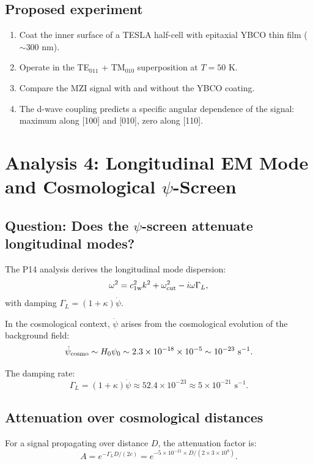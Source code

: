 \documentclass[11pt]{article}
\newcommand{\ee}[1]{\times 10^{#1}}
\begin{document}
\subsection{Proposed experiment}

\begin{enumerate}
\item Coat the inner surface of a TESLA half-cell with epitaxial YBCO thin film ($\sim 300$ nm).
\item Operate in the TE$_{011}$ + TM$_{010}$ superposition at $T = 50$ K.
\item Compare the MZI signal with and without the YBCO coating.
\item The d-wave coupling predicts a specific angular dependence of the signal: maximum along [100] and [010], zero along [110].
\end{enumerate}

\section{Analysis 4: Longitudinal EM Mode and Cosmological $\psi$-Screen}
\label{sec:longitudinal-cosmo}

\subsection{Question: Does the $\psi$-screen attenuate longitudinal modes?}

The P14 analysis derives the longitudinal mode dispersion:
\[
\omega^2 = c_{\rm 1w}^2 k^2 + \omega_{\rm cut}^2 - i\omega\Gamma_L,
\]
with damping $\Gamma_L = (1+\kappa)\dot\psi$.

In the cosmological context, $\dot\psi$ arises from the cosmological evolution of the background field:
\[
\dot\psi_{\rm cosmo} \sim H_0 \psi_0 \sim 2.3\ee{-18} \times 10^{-5} \sim 10^{-23}\text{ s}^{-1}.
\]

The damping rate:
\[
\Gamma_L = (1+\kappa)\dot\psi \approx 52.4 \times 10^{-23} \approx 5\ee{-21}\text{ s}^{-1}.
\]

\subsection{Attenuation over cosmological distances}

For a signal propagating over distance $D$, the attenuation factor is:
\[
A = e^{-\Gamma_L D/(2c)} = e^{-5\ee{-21} \times D/(2 \times 3\ee{8})}.
\]
\end{document}
